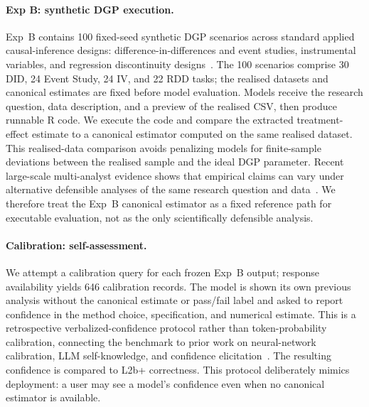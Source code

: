 \documentclass{article}
\begin{document}
\paragraph{Exp B: synthetic DGP execution.}
Exp~B contains 100 fixed-seed synthetic DGP scenarios across standard
applied causal-inference designs: difference-in-differences and event
studies, instrumental variables, and regression discontinuity
designs~\citep{callaway2021did,sun2021eventstudy,mackinlay1997event,
imbens1994identification,angrist1996identification,
thistlethwaite1960regression,imbens2008rdd,lee2010rdd}. The 100 scenarios
comprise 30 DID, 24 Event Study, 24 IV, and 22 RDD tasks; the realised
datasets and canonical estimates are fixed
before model evaluation. Models receive the research question, data
description, and a preview of the realised CSV, then produce runnable R
code. We execute the code and compare the extracted treatment-effect
estimate to a canonical estimator computed on the same realised dataset.
This realised-data comparison avoids penalizing models for finite-sample
deviations between the realised sample and the ideal DGP parameter.
Recent large-scale multi-analyst evidence shows that empirical claims can
vary under alternative defensible analyses of the same research question
and data~\citep{silberzahn2018many,botviniknezer2020variability,aczel2026analyticalrobustness}.
We therefore treat the
Exp~B canonical estimator as a fixed reference path for executable
evaluation, not as the only scientifically defensible analysis.

\paragraph{Calibration: self-assessment.}
We attempt a calibration query for each frozen Exp~B output; response
availability yields 646 calibration records. The model is shown its own
previous analysis without the canonical estimate or pass/fail label and
asked to report confidence in the method choice, specification, and
numerical estimate. This is a
retrospective verbalized-confidence protocol rather than token-probability
calibration, connecting the benchmark to prior work on neural-network
calibration, LLM self-knowledge, and confidence
elicitation~\citep{guo2017calibration,kadavath2022know,
tian2023calibration,xiong2024uncertainty}. The resulting confidence is
compared to L2b+ correctness. This protocol deliberately mimics deployment:
a user may see a model's confidence even when no canonical estimator is
available.
\end{document}
